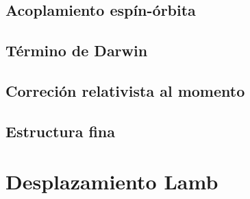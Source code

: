 \subsection{Acoplamiento espín-órbita}

\subsection{Término de Darwin}

\subsection{Correción relativista al momento}

\subsection{Estructura fina}

\section{Desplazamiento Lamb}

